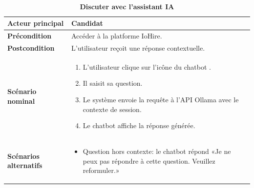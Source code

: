 \documentclass[12pt,a4paper,oneside]{report}
\begin{document}
\begin{itemize}
\begin{table}[H]
\centering
\caption{\textbf{Discuter avec l’assistant IA}} \\
\vspace{0.3cm}
\begin{tabular}{|p{3.5cm}|p{11cm}|}
\hline
\textbf{Acteur principal} & Candidat \\
\hline
\textbf{Précondition} &Accéder à la platforme IoHire. \\
\hline
\textbf{Postcondition} & L’utilisateur reçoit une réponse contextuelle. \\
\hline
\textbf{Scénario nominal} &
\begin{minipage}[t]{10.5cm}
\begin{enumerate}
    \item L’utilisateur clique sur l’icône du chatbot .
    \item Il saisit sa question.
    \item Le système envoie la requête à l’API Ollama avec le contexte de session.
    \item Le chatbot affiche la réponse générée.
    \vspace{0.3cm}
\end{enumerate}
\end{minipage} \\
\hline

\textbf{Scénarios alternatifs} &
\begin{minipage}[t]{10.5cm}
\begin{itemize}
    \item Question hors contexte: le chatbot répond «Je ne peux pas répondre à cette question. Veuillez reformuler.»
    \vspace{0.2cm}
\end{itemize}
\end{minipage} \\
\hline
\end{tabular}
\end{table}


\end{itemize}
\end{document}
